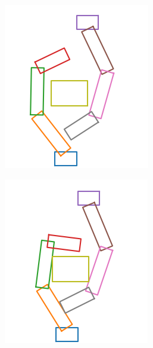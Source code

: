 \documentclass[a4paper,twoside,12pt,papersize, dvipdfmx]{iirthesis}
\begin{document}
\begin{figure}[h]
\centering
\begin{minipage}{0.33\hsize}
\includegraphics[width=\hsize]{fig/3-new-planner/rec_before_FC.png}
\label{fig::planner::beforefc}
\end{minipage}\hfill
\begin{minipage}{0.33\hsize}
\includegraphics[width=\hsize]{fig/3-new-planner/rec_FC_left_right.png}

\end{minipage}
\end{figure}
\end{document}
